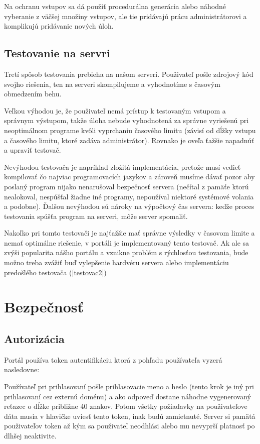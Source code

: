 Na ochranu vstupov sa dá použiť procedurálna generácia alebo náhodné vyberanie z väčšej množiny vstupov, ale tie pridávajú prácu administrátorovi a komplikujú pridávanie nových úloh.

\subsection{Testovanie na servri}
Tretí spôsob testovania prebieha na našom serveri. Použivateľ pošle zdrojový kód svojho riešenia, ten na serveri skompilujeme a vyhodnotíme s časovým obmedzením behu.

Veľkou výhodou je, že použivateľ nemá prístup k testovaným vstupom a správnym výstupom, takže úloha nebude vyhodnotená za správne vyriešenú pri neoptimálnom programe kvôli vyprchaniu časového limitu (závisí od dĺžky vstupu a časového limitu, ktoré zadáva administrátor). Rovnako je oveľa ťažšie napadnúť a upraviť testovač.

Nevýhodou testovača je napríklad zložitá implementácia, pretože musí vedieť kompilovať čo najviac programovacích jazykov a zároveň musíme dávať pozor aby poslaný program nijako nenarušoval bezpečnosť servera (nečítal z pamäťe ktorú nealokoval, nespúšťal žiadne iné programy, nepoužíval niektoré systémové volania a podobne). Ďalšou nevýhodou sú nároky na výpočtový čas servera: keďže proces testovania spúšťa program na serveri, môže server spomaliť.

Nakoľko pri tomto testovači je najťažšie mať správne výsledky v časovom limite a nemať optimálne riešenie, v portáli je implementovaný tento testovač. Ak ale sa zvýši popularita nášho portálu a vznikne problém s rýchlosťou testovania, bude možno treba zvážiť buď vylepšenie hardvéru servera alebo implementáciu predošlého testovača (\ref{testovac2})

\section{Bezpečnosť}
\subsection{Autorizácia}
Portál používa token autentifikáciu ktorá z pohľadu používateľa vyzerá nasledovne:

Používateľ pri prihlasovaní pošle prihlasovacie meno a heslo (tento krok je iný pri prihlasovaní cez externú doménu) a ako odpoveď
dostane náhodne vygenerovaný reťazec o dĺžke približne 40 znakov. Potom všetky požiadavky na použivateľove dáta
 musia v hlavičke uviesť tento token, inak budú zamietnuté.
Server si pamätá použivateľov token až kým sa použivateľ neodhlási alebo mu nevyprší platnosť po dlhšej neaktivite.


